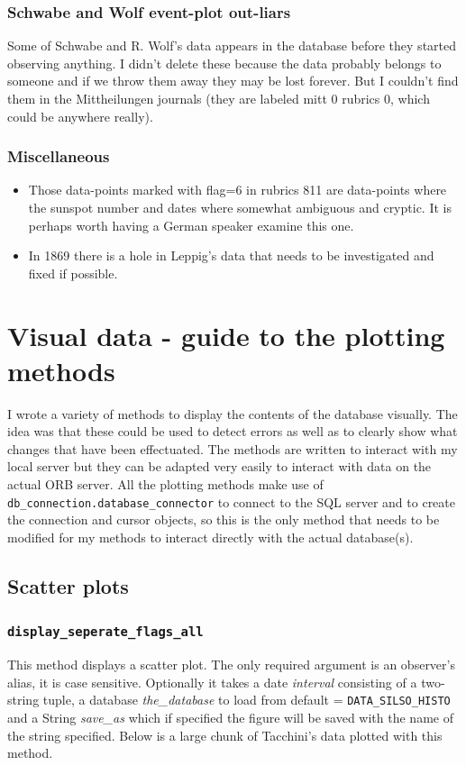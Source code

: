 \documentclass[12pt]{article}
\begin{document}
\subsubsection{Schwabe and Wolf event-plot out-liars}
Some of Schwabe and R. Wolf's data appears in the database before they started observing anything. I didn't delete these because the data probably belongs to someone and if we throw them away they may be lost forever. But I couldn't find them in the Mittheilungen journals (they are labeled mitt 0 rubrics 0, which could be anywhere really).

\subsubsection{Miscellaneous}
\begin{itemize}
    \item Those data-points marked with flag=6 in rubrics 811 are data-points where the sunspot number and dates where somewhat ambiguous and cryptic. It is perhaps worth having a German speaker examine this one.
    \item In 1869 there is a hole in Leppig's data that needs to be investigated and fixed if possible.
\end{itemize}


\section{Visual data - guide to the plotting methods}\label{section:plots and graphs explain}
I wrote a variety of methods to display the contents of the database visually. The idea was that these could be used to detect errors as well as to clearly show what changes that have been effectuated. The methods are written to interact with my local server but they can be adapted very easily to interact with data on the actual ORB server. All the plotting methods make use of \texttt{db\_connection.database\_connector} to connect to the SQL server and to create the connection and cursor objects, so this is the only method that needs to be modified for my methods to interact directly with the actual database(s). 

\subsection{Scatter plots}

\subsubsection{\texttt{display\_seperate\_flags\_all}}
This method displays a scatter plot. The only required argument is an observer's alias, it is case sensitive. Optionally it takes a date \textit{interval} consisting of a two-string tuple, a database \textit{the\_database} to load from default = \texttt{DATA\_SILSO\_HISTO} and a String \textit{save\_as} which if specified the figure will be saved with the name of the string specified. Below is a large chunk of Tacchini's data plotted with this method.\\
\end{document}
